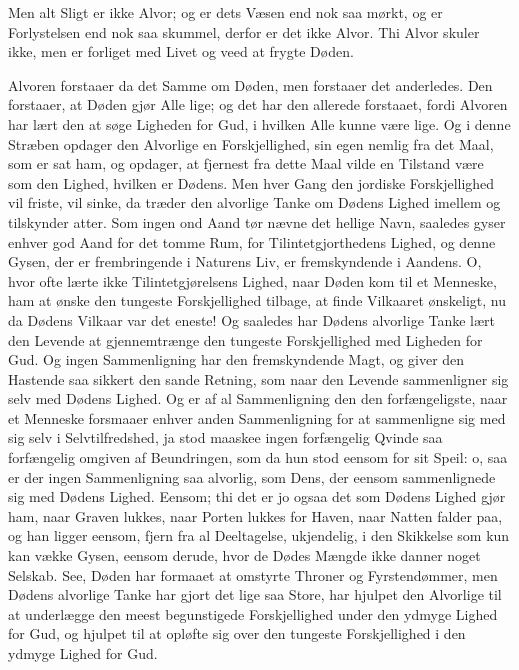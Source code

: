 \documentclass[12pt,a4paper]{article}
\begin{document}
Men alt Sligt er ikke Alvor; og er dets Væsen end nok saa mørkt, og er Forlystelsen end nok saa skummel, derfor er det ikke Alvor. Thi Alvor skuler ikke, men er forliget med Livet og veed at frygte Døden.

Alvoren forstaaer da det Samme om Døden, men forstaaer det anderledes. Den forstaaer, at Døden gjør Alle lige; og det har den allerede forstaaet, fordi Alvoren har lært den at søge Ligheden for Gud, i hvilken Alle kunne være lige. Og i denne Stræben opdager den Alvorlige en Forskjellighed, sin egen nemlig fra det Maal, som er sat ham, og opdager, at fjernest fra dette Maal vilde en Tilstand være som den Lighed, hvilken er Dødens. Men hver Gang den jordiske Forskjellighed vil friste, vil sinke, da træder den alvorlige Tanke om Dødens Lighed imellem og tilskynder atter. Som ingen ond Aand tør nævne det hellige Navn, saaledes gyser enhver god Aand for det tomme Rum, for Tilintetgjorthedens Lighed, og denne Gysen, der er frembringende i Naturens Liv, er fremskyndende i Aandens. O, hvor ofte lærte ikke Tilintetgjørelsens Lighed, naar Døden kom til et Menneske, ham at ønske den tungeste Forskjellighed tilbage, at finde Vilkaaret ønskeligt, nu da Dødens Vilkaar var det eneste! Og saaledes har Dødens alvorlige Tanke lært den Levende at gjennemtrænge den tungeste Forskjellighed med Ligheden for Gud. Og ingen Sammenligning har den fremskyndende Magt, og giver den Hastende saa sikkert den sande Retning, som naar den Levende sammenligner sig selv med Dødens Lighed. Og er af al Sammenligning den den forfængeligste, naar et Menneske forsmaaer enhver anden Sammenligning for at sammenligne sig med sig selv i Selvtilfredshed, ja stod maaskee ingen forfængelig Qvinde saa forfængelig omgiven af Beundringen, som da hun stod eensom for sit Speil: o, saa er der ingen Sammenligning saa alvorlig, som Dens, der eensom sammenlignede sig med Dødens Lighed. Eensom; thi det er jo ogsaa det som Dødens Lighed gjør ham, naar Graven lukkes, naar Porten lukkes for Haven, naar Natten falder paa, og han ligger eensom, fjern fra al Deeltagelse, ukjendelig, i den Skikkelse som kun kan vække Gysen, eensom derude, hvor de Dødes Mængde ikke danner noget Selskab. See, Døden har formaaet at omstyrte Throner og Fyrstendømmer, men Dødens alvorlige Tanke har gjort det lige saa Store, har hjulpet den Alvorlige til at underlægge den meest begunstigede Forskjellighed under den ydmyge Lighed for Gud, og hjulpet til at opløfte sig over den tungeste Forskjellighed i den ydmyge Lighed for Gud.
\end{document}
